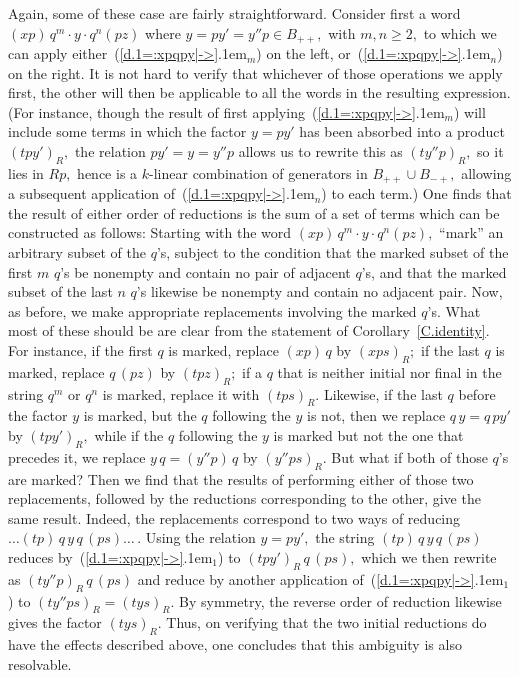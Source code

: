 \documentclass{amsart}
\begin{document}
Again, some of these case are fairly straightforward.
Consider first a word $(xp)\,q^m\cdot y \cdot q^n (pz)$
where $y=py'=y''p\in B_{++},$ with $m,n\geq 2,$ to which we can apply
either~({{\setlength{\mathsurround}{0em}\ref{d.1=:xpqpy|->}\kern.1em$_{{m}}$}}) on the left, or~({{\setlength{\mathsurround}{0em}\ref{d.1=:xpqpy|->}\kern.1em$_{{n}}$}}) on the right.
It is not hard to verify that whichever of those operations
we apply first, the other will then be applicable to all
the words in the resulting expression.
(For instance, though the result of first applying~({{\setlength{\mathsurround}{0em}\ref{d.1=:xpqpy|->}\kern.1em$_{{m}}$}})
will include some terms in which the factor $y=py'$ has been
absorbed into a product $(tpy')_R,$ the relation $py'=y=y''p$
allows us to rewrite this as $(ty''p)_R,$ so it lies in $Rp,$
hence is a $\!k\!$-linear combination of generators
in $B_{++}\cup B_{-+},$ allowing a subsequent application
of~({{\setlength{\mathsurround}{0em}\ref{d.1=:xpqpy|->}\kern.1em$_{{n}}$}}) to each term.)
One finds that the result of either order of
reductions is the sum of a set of terms which can be constructed
as follows:
Starting with the word $(xp)\,q^m\cdot y \cdot q^n (pz),$
``mark'' an arbitrary subset of the $\!q\!$'s, subject
to the condition that the marked subset of the first $m$
$\!q\!$'s be nonempty and contain no pair of adjacent $\!q\!$'s,
and that the marked subset of the last $n$
$\!q\!$'s likewise be nonempty and contain no adjacent pair.
Now, as before, we make appropriate replacements involving the marked
$\!q\!$'s.
What most of these should be are clear from
the statement of Corollary~\ref{C.identity}.
For instance, if the first $q$ is marked,
replace $(xp)\,q$ by $(xps)_R;$
if the last $q$ is marked, replace $q\,(pz)$ by $(tpz)_R;$
if a $q$ that is neither initial nor final in the string
$q^m$ or $q^n$ is marked, replace it with $(tps)_R.$
Likewise, if the last $q$ before the factor $y$ is marked,
but the $q$ following the $y$ is not, then we replace
$q\,y=q\,py'$ by $(tpy')_R,$ while if
the $q$ following the $y$ is marked but not the one that
precedes it, we replace $y\,q=(y''p)\,q$ by $(y''ps)_R.$
But what if both of those $\!q\!$'s are marked?
Then we find that the results of performing either of those
two replacements, followed by the reductions
corresponding to the other, give the same result.
Indeed, the replacements correspond to two ways of
reducing $\dots(tp)\,q\,y\,q\,(ps)\dots\,.$
Using the relation $y=py',$ the string $(tp)\,q\,y\,q\,(ps)$ reduces
by~({{\setlength{\mathsurround}{0em}\ref{d.1=:xpqpy|->}\kern.1em$_{{1}}$}}) to $(tpy')_R\,q\,(ps),$ which we then rewrite
as $(ty''p)_R\,q\,(ps)$ and reduce by another application
of~({{\setlength{\mathsurround}{0em}\ref{d.1=:xpqpy|->}\kern.1em$_{{1}}$}}) to $(ty''ps)_R=(tys)_R.$
By symmetry, the reverse order of reduction
likewise gives the factor $(tys)_R.$
Thus, on verifying that the two initial reductions do
have the effects described above, one concludes that
this ambiguity is also resolvable.
\end{document}

